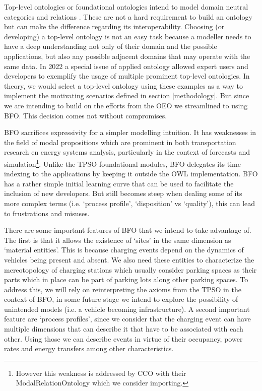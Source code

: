 Top-level ontologies or foundational ontologies intend to model domain neutral
categories and relations \cite{Arp.2015}. These are not a hard requirement to
build an ontology but can make the difference regarding its interoperability.
Choosing (or developing) a top-level ontology is not an easy task because a
modeller needs to have a deep understanding not only of their domain and the
possible applications, but also any possible adjacent domains that may operate
with the same data. In 2022 a special issue of applied ontology
\cite{Borgo.2022} allowed expert users and developers to exemplify the usage of
multiple prominent top-level ontologies. In theory, we would select a top-level
ontology using these examples as a way to implement the motivating scenarios
defined in section \ref{methodology}. But since we are intending to build on
the efforts from the OEO we streamlined to using BFO. This decision comes not
without compromises. 

BFO sacrifices expressivity for a simpler modelling intuition. It has
weaknesses in the field of modal propositions which are prominent in both
transportation research en energy systems analysis, particularly in the context
of forecasts and simulation\footnote{However this weakness is addressed by CCO
with their ModalRelationOntology which we consider importing. }. Unlike the
TPSO foundational modules, BFO delegates its time indexing to the applications
by keeping it outside the OWL implementation. BFO has a rather simple initial
learning curve that can be used to facilitate the inclusion of new developers.
But still becomes steep when dealing some of its more complex terms (i.e.
`process profile', `disposition' vs `quality'), this can lead to frustrations
and misuses.

There are some important features of BFO that we intend to take advantage of.
The first is that it allows the existence of `sites' in the same dimension as
`material entities'. This is because charging events depend on the dynamics of
vehicles being present and absent. We also need these entities to characterize
the mereotopology of charging stations which usually consider parking spaces as
their parts which in place can be part of parking lots along other parking
spaces. To address this, we will rely on reinterpreting the axioms from the
TPSO in the context of BFO, in some future stage we intend to explore the
possibility of unintended models (i.e. a vehicle becoming infrastructure). A
second important feature are `process profiles', since we consider that the
charging event can have multiple dimensions that can describe it that have to
be associated with each other. Using those we can describe events in virtue of
their occupancy, power rates and energy transfers among other characteristics.
